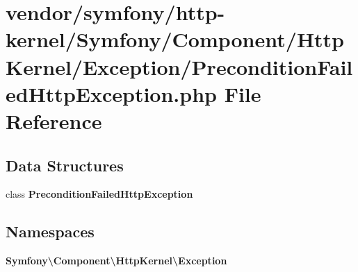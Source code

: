 \section{vendor/symfony/http-\/kernel/\+Symfony/\+Component/\+Http\+Kernel/\+Exception/\+Precondition\+Failed\+Http\+Exception.php File Reference}
\label{_precondition_failed_http_exception_8php}
\subsection*{Data Structures}
\begin{DoxyCompactItemize}
\item 
class {\bf Precondition\+Failed\+Http\+Exception}
\end{DoxyCompactItemize}
\subsection*{Namespaces}
\begin{DoxyCompactItemize}
\item 
 {\bf Symfony\textbackslash{}\+Component\textbackslash{}\+Http\+Kernel\textbackslash{}\+Exception}
\end{DoxyCompactItemize}
